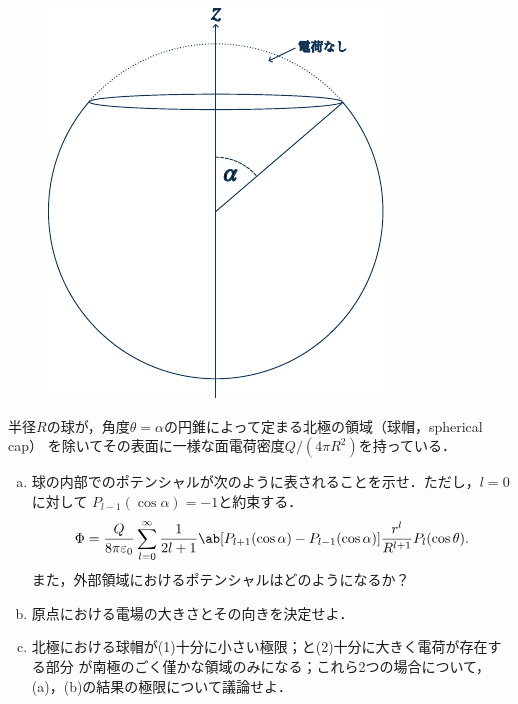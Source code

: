 \begin{bx1}
  \begin{figure}
    \centering
    \includegraphics[width=\linewidth]{fig/Jackson3-2.pdf}%
  \end{figure}%
  半径$R$の球が，角度$\theta =  \alpha$の円錐によって定まる北極の領域（球帽，spherical cap）
  を除いてその表面に一様な面電荷密度$Q / (4\pi R^2)$を持っている．
  \begin{enumerate}[(a)]%
    \item  
  球の内部でのポテンシャルが次のように表されることを示せ．ただし，$l = 0$に対して
      $P_{l-1}(\cos\alpha) = -1$と約束する．
      \begin{gather}%
        \Phi = \frac{Q}{8\pi\eps_0} \sum_{l=0}^{\infty} \frac{1}{2l+1} \ab[
          P_{l+1}(\cos\alpha) - P_{l-1}(\cos\alpha)
        ] \frac{r^l}{R^{l+1}} P_l(\cos\theta).
      \end{gather}%
    また，外部領域におけるポテンシャルはどのようになるか？
  \item 
    原点における電場の大きさとその向きを決定せよ．
  \item
    北極における球帽が(1)十分に小さい極限；と(2)十分に大きく電荷が存在する部分
      が南極のごく僅かな領域のみになる；これら2つの場合について，
      (a)，(b)の結果の極限について議論せよ．
  \end{enumerate}%
\end{bx1}

